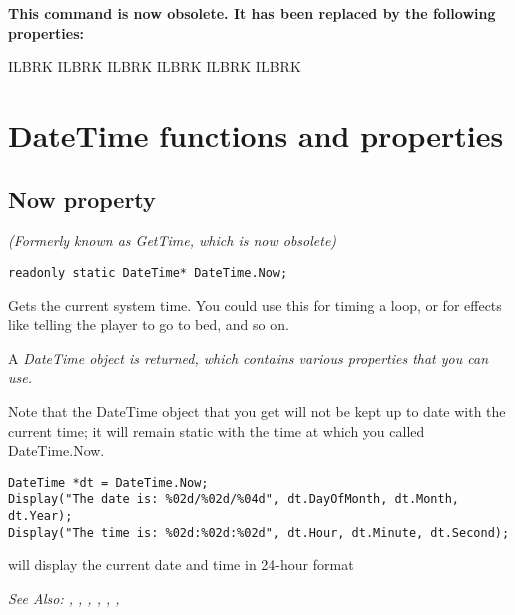 \bf{This command is now obsolete. It has been replaced by the following properties:}

 ILBRK
 ILBRK
 ILBRK
 ILBRK
 ILBRK
 ILBRK



\section{DateTime functions and properties}%


\subsection{Now property}\label{DateTime.Now}%

\it{(Formerly known as GetTime, which is now obsolete)}

\begin{verbatim}
readonly static DateTime* DateTime.Now;
\end{verbatim}
Gets the current system time.
You could use this for timing a loop, or for effects like telling the
player to go to bed, and so on.

A \it{DateTime} object is returned, which contains various properties that you can use.

Note that the DateTime object that you get will not be kept up to date with the current time;
it will remain static with the time at which you called DateTime.Now.

\begin{verbatim}
DateTime *dt = DateTime.Now;
Display("The date is: %02d/%02d/%04d", dt.DayOfMonth, dt.Month, dt.Year);
Display("The time is: %02d:%02d:%02d", dt.Hour, dt.Minute, dt.Second);
\end{verbatim}
will display the current date and time in 24-hour format

\it{See Also:} ,
,
,
,
,
,


